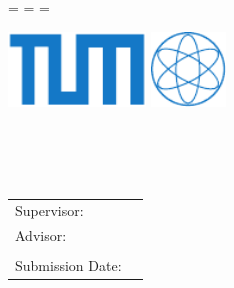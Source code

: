 \begin{titlepage}
  \oddsidemargin=\evensidemargin\relax
  \textwidth=\dimexpr{}\evensidemargin-2in\relax
  \hsize=\textwidth\relax

  \centering

  \vspace{20mm}
  \includegraphics[height=20mm]{logos/tum}
  \hspace*{10mm}
  \includegraphics[height=20mm]{logos/faculty}

  \vspace{5mm}
  {\huge\MakeUppercase{\getFaculty{}}}\\

  \vspace{5mm}
  {\large\MakeUppercase{\getUniversity{}}}\\

  \vspace{5mm}
  {\large \getChair{}}\\

  \vspace{20mm}
  {\Large \getDoctype{}}

  \vspace{10mm}
  {\huge\bfseries \getTitle{}}

  \vspace{10mm}
  {\LARGE \getAuthor{}}

  \vspace{10mm}
  \begin{tabular}{l l}
    Supervisor: & \getSupervisor{} \\
    Advisor: & \getAdvisor{} \\
             & \getSecondAdvisor{} \\
    Submission Date: & \getSubmissionDate{} \\
  \end{tabular}

\end{titlepage}
